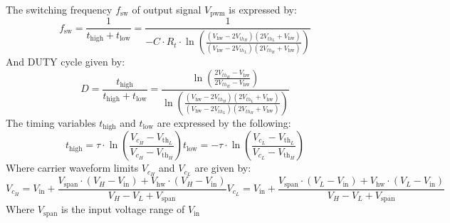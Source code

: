 The switching frequency $f_{\mathrm{sw}}$ of output signal $V_{\mathrm{pwm}}$ is expressed by:
\begin{equation}
	f_{\mathrm{sw}} = \frac{1}{t_{\mathrm{high}} + t_{\mathrm{low}}} = \frac{1}{-C \cdot R_{t} \cdot \ln \left( \frac{(V_{\mathrm{hw}} - 2V_{th_{H}}) (2V_{th_{L}} + V_{\mathrm{hw}})}{ (V_{\mathrm{hw}} - 2V_{th_{L}}) (2V_{th_{H}}+ V_{\mathrm{hw}}) } \right) }
\end{equation}
And DUTY cycle given by:
\begin{equation}
	D = \frac{t_{\mathrm{high}}}{t_{\mathrm{high}} + t_{\mathrm{low}}} = \frac{\ln \left( \frac{2V_{th_{H}} - V_{\mathrm{hw}}}{2V_{th_{H}} - V_{\mathrm{hw}}} \right) }{\ln \left( \frac{(V_{\mathrm{hw}} - 2V_{th_{H}}) (2V_{th_{L}} + V_{\mathrm{hw}})}{ (V_{\mathrm{hw}} - 2V_{th_{L}}) (2V_{th_{H}}+ V_{\mathrm{hw}}) } \right)}
\end{equation}
The timing variables $t_{\mathrm{high}}$ and $t_{\mathrm{low}}$ are expressed by the following:
\begin{subequations} \label{eq:aim_timing}
	\begin{equation} \label{eq:aim_timing_a}
		t_{\mathrm{high}} = \tau \cdot \ln \left( \frac{V_{c_{H}} - V_{\mathrm{th}_{L}}}{V_{c_{H}} - V_{\mathrm{th}_{H}}} \right) 
	\end{equation}
	\begin{equation} \label{eq:aim_timing_b}
		t_{\mathrm{low}} = -\tau \cdot \ln \left( \frac{V_{c_{L}} - V_{\mathrm{th}_{L}}}{V_{c_{L}} - V_{\mathrm{th}_{H}}} \right)
	\end{equation}
\end{subequations}
Where carrier waveform limits $V_{c_{H}}$ and $V_{c_{L}}$ are given by:
\begin{subequations} \label{eq:carrier_waveform}
	\begin{equation} \label{eq:carrier_waveform_a}
		V_{c_{H}} = V_{\mathrm{in}} + \frac{V_{\mathrm{span}} \cdot \left( V_{H} - V_{\mathrm{in}} \right) + V_{\mathrm{hw}} \cdot \left( V_{H} - V_{\mathrm{in}} \right)  }{V_{H} - V_{L} + V_{\mathrm{span}}}
	\end{equation}
	\begin{equation} \label{eq:carrier_waveform_b}
		V_{c_{L}} = V_{\mathrm{in}} + \frac{V_{\mathrm{span}} \cdot \left( V_{L} - V_{\mathrm{in}} \right) + V_{\mathrm{hw}} \cdot \left( V_{L} - V_{\mathrm{in}} \right)  }{V_{H} - V_{L} + V_{\mathrm{span}}}
	\end{equation}
\end{subequations}
Where $V_{\mathrm{span}}$ is the input voltage range of $V_{\mathrm{in}}$

